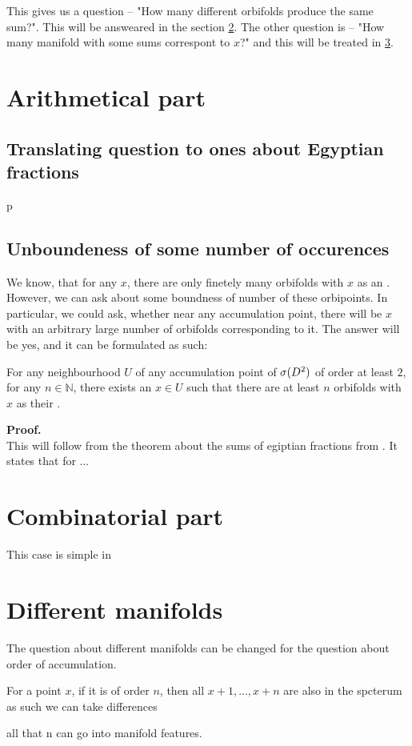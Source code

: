 This gives us a question -- "How many different orbifolds produce the same sum?".
This will be answeared in the section \ref{counting_combinatorics}.
The other question is -- "How many manifold with some sums correspont to $x$?" and this will 
be treated in \ref{conting_diff_man}. 

\section{Arithmetical part}\label{conting_arithmetical}

\subsection{Translating question to ones about Egyptian fractions}\label{Egyptian_fractions}
p
\subsection{Unboundeness of some number of occurences}
We know, that for any $x$, there are only finetely many orbifolds with $x$ as an \Eoc . 
However, we can ask about some boundness of number of these orbipoints. 
In particular, we could ask, whether near any accumulation point, there will be $x$ with an 
arbitrary large number of orbifolds corresponding to it. 
The answer will be yes, and it can be formulated as such:
\begin{theorem}
For any neighbourhood $U$ of any accumulation point of ${{\sigma}(D^2)}$ of order at least $2$, for any 
$n\in \mathbb{N}$, 
there exists an $x\in U$ such that there are at least $n$ orbifolds with $x$ as their 
\Eoc.
\end{theorem}
\textbf{Proof.}\\
This will follow from the theorem about the sums of egiptian fractions from \cite{Browning2011}.
It states that for ...




\section{Combinatorial part}\label{counting_combinatorics}
This case is simple in 

\section{Different manifolds}\label{conting_diff_man}
The question about different manifolds can be changed for the question about order of 
accumulation. 

For a point $x$, if it is of order $n$, then all $x+1,...,x+n$ are also in the spcterum
as such we can take differences

all that n can go into manifold features.
 












